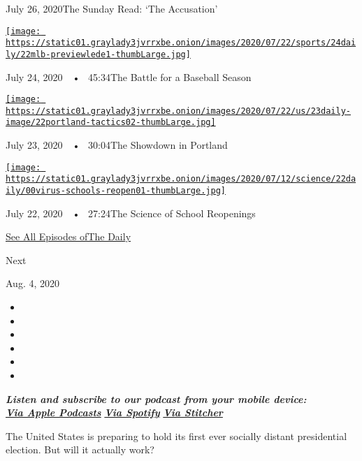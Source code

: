 July 26, 2020The Sunday Read: `The Accusation'

\href{https://www.nytimes3xbfgragh.onion/2020/07/24/podcasts/the-daily/mlb-baseball-season-coronavirus.html?action=click\&module=audio-series-bar\&region=header\&pgtype=Article}{\texttt{[image: https://static01.graylady3jvrrxbe.onion/images/2020/07/22/sports/24daily/22mlb-previewlede1-thumbLarge.jpg]}}

July 24, 2020~~•~ 45:34The Battle for a Baseball Season

\href{https://www.nytimes3xbfgragh.onion/2020/07/23/podcasts/the-daily/portland-protests.html?action=click\&module=audio-series-bar\&region=header\&pgtype=Article}{\texttt{[image: https://static01.graylady3jvrrxbe.onion/images/2020/07/22/us/23daily-image/22portland-tactics02-thumbLarge.jpg]}}

July 23, 2020~~•~ 30:04The Showdown in Portland

\href{https://www.nytimes3xbfgragh.onion/2020/07/22/podcasts/the-daily/school-reopenings-coronavirus.html?action=click\&module=audio-series-bar\&region=header\&pgtype=Article}{\texttt{[image: https://static01.graylady3jvrrxbe.onion/images/2020/07/12/science/22daily/00virus-schools-reopen01-thumbLarge.jpg]}}

July 22, 2020~~•~ 27:24The Science of School Reopenings

\href{https://www.nytimes3xbfgragh.onion/column/the-daily}{See All
Episodes ofThe Daily}

Next

Aug. 4, 2020

\begin{itemize}
\item
\item
\item
\item
\item
\item
\end{itemize}

\emph{\textbf{Listen and subscribe to our podcast from your mobile
device:}}\\
\textbf{\href{https://itunes.apple.com/us/podcast/the-daily/id1200361736?mt=2}{\emph{Via
Apple Podcasts}}} \emph{\textbf{\textbar{}}}
\textbf{\href{https://open.spotify.com/show/3IM0lmZxpFAY7CwMuv9H4g?si=SfuMSC55R1qprFsRZU3_zw}{\emph{Via
Spotify}}} \emph{\textbf{\textbar{}}}
\textbf{\href{http://www.stitcher.com/podcast/the-new-york-times/the-daily-10}{\emph{Via
Stitcher}}}

The United States is preparing to hold its first ever socially distant
presidential election. But will it actually work?

